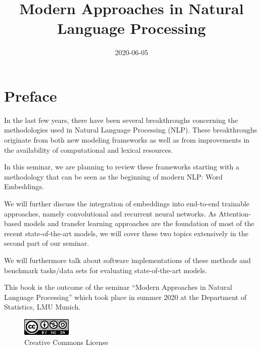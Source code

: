 \documentclass[]{krantz}
\title{Modern Approaches in Natural Language Processing}
\author{}
\date{\vspace{-2.5em}2020-06-05}
\begin{document}
\maketitle


\thispagestyle{empty}

\begin{center}
\end{center}

\setlength{\abovedisplayskip}{-5pt}
\setlength{\abovedisplayshortskip}{-5pt}

{
\hypersetup{linkcolor=}
\setcounter{tocdepth}{0}
\tableofcontents
}
\hypertarget{preface}{%
\chapter*{Preface}\label{preface}}


In the last few years, there have been several breakthroughs concerning the methodologies used in Natural Language Processing (NLP). These breakthroughs originate from both new modeling frameworks as well as from improvements in the availability of computational and lexical resources.

In this seminar, we are planning to review these frameworks starting with a methodology that can be seen as the beginning of modern NLP: Word Embeddings.

We will further discuss the integration of embeddings into end-to-end trainable approaches, namely convolutional and recurrent neural networks. As Attention-based models and transfer learning approaches are the foundation of most of the recent state-of-the-art models, we will cover these two topics extensively in the second part of our seminar.

We will furthermore talk about software implementations of these methods and benchmark tasks/data sets for evaluating state-of-the-art models.

This book is the outcome of the seminar ``Modern Approaches in Natural Language Processing'' which took place in summer 2020 at the Department of Statistics, LMU Munich.

\begin{figure}
\centering
\includegraphics{figures/by-nc-sa.png}
\caption{Creative Commons License}
\end{figure}
\end{document}
